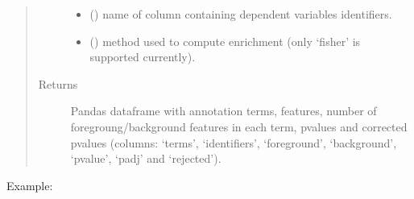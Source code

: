\documentclass[letterpaper,10pt,english]{sphinxmanual}
\begin{document}
\begin{fulllineitems}
\begin{quote}
\begin{description}
\begin{itemize}
\item {} 
 () \textendash{} name of column containing dependent variables identifiers.

\item {} 
 () \textendash{} method used to compute enrichment (only ‘fisher’ is supported currently).

\end{itemize}

\item[{Returns}] \leavevmode
Pandas dataframe with annotation terms, features, number of foregroung/background features in each term, p\sphinxhyphen{}values and corrected p\sphinxhyphen{}values (columns: ‘terms’, ‘identifiers’, ‘foreground’, ‘background’, ‘pvalue’, ‘padj’ and ‘rejected’).

\end{description}\end{quote}

Example:

\begin{sphinxVerbatim}[commandchars=\\\{\}]
          
\end{sphinxVerbatim}

\end{fulllineitems}
\end{document}
